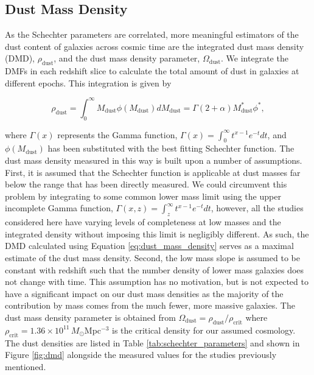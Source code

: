 \subsection{Dust Mass Density}

As the Schechter parameters are correlated, more meaningful estimators of the dust content of galaxies across cosmic time are the integrated dust mass density (DMD), $\rho_{\textrm{dust}}$, and the dust mass density parameter, $\Omega_{\textrm{dust}}$. We integrate the DMFs in each redshift slice to calculate the total amount of dust in galaxies at different epochs. This integration is given by

\begin{equation}
    \rho_{\textrm{dust}} = \int_0^\infty M_{\textrm{dust}} \phi(M_{\textrm{dust}}) dM_{\textrm{dust}} = \Gamma(2+\alpha) M_{\textrm{dust}}^* \phi^*,
    \label{eq:dust_mass_density}
\end{equation}

\noindent where $\Gamma(x)$ represents the Gamma function, $\Gamma(x) = \int_0^\infty t^{x-1}e^{-t} dt$, and $\phi(M_{\textrm{dust}})$ has been substituted with the best fitting Schechter function. The dust mass density measured in this way is built upon a number of assumptions. First, it is assumed that the Schechter function is applicable at dust masses far below the range that has been directly measured. We could circumvent this problem by integrating to some common lower mass limit using the upper incomplete Gamma function, $\Gamma(x, z) = \int_z^\infty t^{x-1}e^{-t} dt$, however, all the studies considered here have varying levels of completeness at low masses and the integrated density without imposing this limit is negligibly different. As such, the DMD calculated using Equation \ref{eq:dust_mass_density} serves as a maximal estimate of the dust mass density. Second, the low mass slope is assumed to be constant with redshift such that the number density of lower mass galaxies does not change with time. This assumption has no motivation, but is not expected to have a significant impact on our dust mass densities as the majority of the contribution by mass comes from the much fewer, more massive galaxies. The dust mass density parameter is obtained from $\Omega_{\textrm{dust}} = \rho_{\textrm{dust}}/\rho_{\textrm{crit}}$ where $\rho_{\textrm{crit}} = 1.36\times10^{11}\,M_{\odot}$Mpc$^{-3}$ is the critical density for our assumed cosmology. The dust densities are listed in Table \ref{tab:schechter_parameters} and shown in Figure \ref{fig:dmd} alongside the measured values for the studies previously mentioned. 

